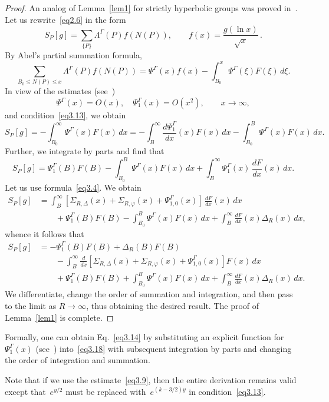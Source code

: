 \documentclass{amsart}
\theoremstyle{plain}
\theoremstyle{definition}
\numberwithin{equation}{section}
\begin{document}
\begin{proof}
An analog of Lemma~\ref{lem1} for strictly hyperbolic groups was
proved in~\cite{10}. Let us rewrite~\eqref{eq2.6} in the form
$$
S_P[g]=\sum_{\{P\}}\Lambda^\Gamma(P)f(N(P)),\qquad
f(x)=\frac{g(\ln x)}{\sqrt x}\,.
$$
By Abel's partial summation formula,
$$
\sum_{B_0\leqslant N(P)\leqslant x}\Lambda^\Gamma(P)f(N(P))=
\Psi^\Gamma(x)f(x)-\int_{B_0}^x\Psi^\Gamma(\xi)F(\xi)\,d\xi.
$$
In view of the estimates (see~\cite{15,16})
$$
\Psi^\Gamma(x)=O(x),\quad
\Psi^\Gamma_1(x)=O(x^2),\qquad
x\to\infty,
$$
and condition~\eqref{eq3.13}, we obtain
$$
S_P[g]=-\int_{B_0}^\infty\Psi^\Gamma(x)F(x)\,dx=
-\int_B^\infty\frac{d\Psi^\Gamma_1}{dx}(x)F(x)\,dx-
\int_{B_0}^B\Psi^\Gamma(x)F(x)\,dx.
$$
Further, we integrate by parts and find that
\begin{equation}
\label{eq3.18}
S_P[g]=\Psi^\Gamma_1(B)F(B)-\int_{B_0}^B\Psi^\Gamma(x)F(x)\,dx+
\int_B^\infty\Psi_1^\Gamma(x)\,\frac{dF}{dx}(x)\,dx.
\end{equation}
Let us use formula~\eqref{eq3.4}. We obtain
\begin{align*}
S_{P}[g]&=\int_B^\infty[\Sigma_{R,\Delta}(x)+\Sigma_{R,\varphi}(x)+
\Psi^\Gamma_{1,0}(x)]\,\frac{dF}{dx}(x)\,dx
\\
&\qquad+\Psi_1^\Gamma(B)F(B)-\int_{B_0}^B\Psi^\Gamma(x)F(x)\,dx+
\int_B^\infty\frac{dF}{dx}(x)\Delta_R(x)\,dx,
\end{align*}
whence it follows that
\begin{align*}
S_{P}[g]&=-\Psi_1^\Gamma(B)F(B)+\Delta_R(B)F(B)
\\
&\qquad-\int_B^\infty\frac{d}{dx}[\Sigma_{R,\Delta}(x)+\Sigma_{R,\varphi}(x)+
\Psi^\Gamma_{1,0}(x)]F(x)\,dx
\\
&\qquad+\Psi_1^\Gamma(B)F(B)+\int_{B_0}^B\Psi^\Gamma(x)F(x)\,dx+
\int_B^\infty\frac{dF}{dx}(x)\Delta_R(x)\,dx.
\end{align*}
We differentiate, change the order of summation and integration,
and then pass to the limit as $R\to\infty$, thus obtaining the
desired result. The proof of Lemma~\ref{lem1} is complete.
\end{proof}

Formally, one can obtain Eq.~\eqref{eq3.14} by substituting an
explicit function for~$\Psi_1^\Gamma(x)$ (see~\cite{16})
into~\eqref{eq3.18} with subsequent integration by parts and
changing the order of integration and summation.

Note that if we use the estimate~\eqref{eq3.9}, then the entire
derivation remains valid except that~$e^{y/2}$ must be replaced
with~$e^{(k-3/2)y}$ in condition~\eqref{eq3.13}.
\end{document}
